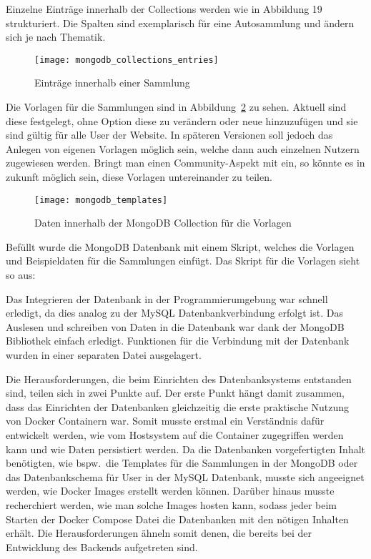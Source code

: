 Einzelne Einträge innerhalb der Collections werden wie in Abbildung 19 strukturiert.
Die Spalten sind exemplarisch für eine Autosammlung und ändern sich je nach Thematik.

\begin{figure}[h!]
    \centering
    \texttt{[image: mongodb\_collections\_entries]}
    \caption{Einträge innerhalb einer Sammlung}\label{fig:figure}
\end{figure}
\newpage
Die Vorlagen für die Sammlungen sind in Abbildung~\ref{fig:mongodb_templates} zu sehen.
Aktuell sind diese festgelegt, ohne Option diese zu verändern oder neue hinzuzufügen und sie sind gültig für alle User der Website.
In späteren Versionen soll jedoch das Anlegen von eigenen Vorlagen möglich sein, welche dann auch einzelnen Nutzern zugewiesen werden.
Bringt man einen Community-Aspekt mit ein, so könnte es in zukunft möglich sein, diese Vorlagen untereinander zu teilen.

\begin{figure}[h]
    \centering
    \texttt{[image: mongodb\_templates]}
    \caption{Daten innerhalb der MongoDB Collection für die Vorlagen}
    \label{fig:mongodb_templates}
\end{figure}
\newpage
Befüllt wurde die MongoDB Datenbank mit einem Skript, welches die Vorlagen und Beispieldaten für die Sammlungen einfügt.
Das Skript für die Vorlagen sieht so aus:

\vspace{1em}

\vspace{1em}

Das Integrieren der Datenbank in der Programmierumgebung war schnell erledigt, da dies analog zu der MySQL Datenbankverbindung erfolgt ist.
Das Auslesen und schreiben von Daten in die Datenbank war dank der MongoDB Bibliothek einfach erledigt.
Funktionen für die Verbindung mit der Datenbank wurden in einer separaten Datei ausgelagert.

Die Herausforderungen, die beim Einrichten des Datenbanksystems entstanden sind, teilen sich in zwei Punkte auf.
Der erste Punkt hängt damit zusammen, dass das Einrichten der Datenbanken gleichzeitig die erste praktische Nutzung von Docker Containern war.
Somit musste erstmal ein Verständnis dafür entwickelt werden, wie vom Hostsystem auf die Container zugegriffen werden kann und wie Daten persistiert werden.
Da die Datenbanken vorgefertigten Inhalt benötigten, wie bspw.\ die Templates für die Sammlungen in der MongoDB oder das Datenbankschema für User in der MySQL Datenbank, musste sich angeeignet werden, wie Docker Images erstellt werden können.
Darüber hinaus musste recherchiert werden, wie man solche Images hosten kann, sodass jeder beim Starten der Docker Compose Datei die Datenbanken mit den nötigen Inhalten erhält.
Die Herausforderungen ähneln somit denen, die bereits bei der Entwicklung des Backends aufgetreten sind.

